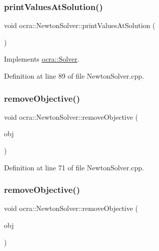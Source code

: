 \subsubsection{\texorpdfstring{print\+Values\+At\+Solution()}{printValuesAtSolution()}}
{\footnotesize\ttfamily void ocra\+::\+Newton\+Solver\+::print\+Values\+At\+Solution (\begin{DoxyParamCaption}\item[{void}]{ }\end{DoxyParamCaption})\hspace{0.3cm}{\ttfamily [virtual]}}



Implements \hyperlink{classocra_1_1Solver_ab1903098e25c16a9f92c36d37967e8fa}{ocra\+::\+Solver}.



Definition at line 89 of file Newton\+Solver.\+cpp.

\hypertarget{classocra_1_1NewtonSolver_a0f2c1366ef076469735020c20f759dd6}{}\label{classocra_1_1NewtonSolver_a0f2c1366ef076469735020c20f759dd6} 
\subsubsection{\texorpdfstring{remove\+Objective()}{removeObjective()}\hspace{0.1cm}{\footnotesize\ttfamily [1/2]}}
{\footnotesize\ttfamily void ocra\+::\+Newton\+Solver\+::remove\+Objective (\begin{DoxyParamCaption}\item[{\hyperlink{classocra_1_1Function}{Function} \&}]{obj }\end{DoxyParamCaption})}



Definition at line 71 of file Newton\+Solver.\+cpp.

\hypertarget{classocra_1_1NewtonSolver_a99308db30e18ed33f7797c308e03ff92}{}\label{classocra_1_1NewtonSolver_a99308db30e18ed33f7797c308e03ff92} 
\subsubsection{\texorpdfstring{remove\+Objective()}{removeObjective()}\hspace{0.1cm}{\footnotesize\ttfamily [2/2]}}
{\footnotesize\ttfamily void ocra\+::\+Newton\+Solver\+::remove\+Objective (\begin{DoxyParamCaption}\item[{\hyperlink{namespaceocra_a37a91885f4fa5c523d22cb15d5673062}{Generic\+Objective} \&}]{obj }\end{DoxyParamCaption})}




